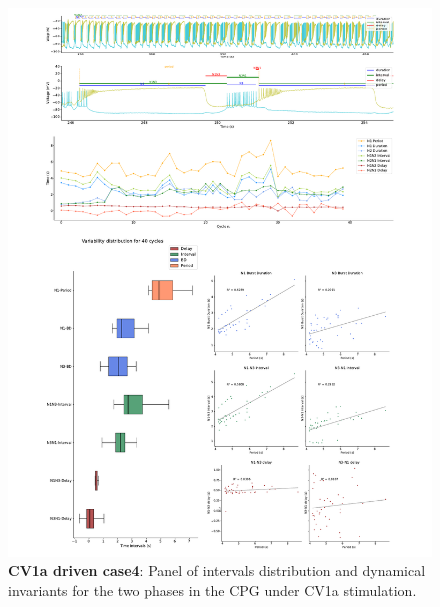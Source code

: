 \begin{figure}[htbp]
	\centering
	\includegraphics[width=1.1\textwidth]{./invariants/data/SUSSEX/CV1a_driven4/images/2phases/panel_with_intervals.pdf}
	\caption{\textbf{CV1a driven case4}: Panel of intervals distribution and dynamical invariants for the two phases in the CPG under CV1a stimulation.}
	\label{fig:cv1a 4 2phases}
\end{figure}

